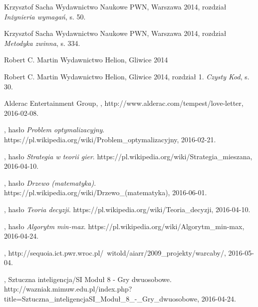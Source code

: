 \documentclass[11pt]{aghdpl}
\begin{document}
\begin{thebibliography}{1}
\bibitem{}
\label{bib:analiza_wymagan}
Krzysztof Sacha
\newblock Wydawnictwo Naukowe PWN, Warszawa 2014,
\newblock rozdział {\em Inżynieria wymagań}, s. 50.

\bibitem{}
\label{bib:metodyka_zwinna}
Krzysztof Sacha
\newblock Wydawnictwo Naukowe PWN, Warszawa 2014,
\newblock rozdział {\em Metodyka zwinna}, s. 334.

\bibitem{}
\label{bib:czysty_kod}
Robert C. Martin
\newblock Wydawnictwo Helion, Gliwice 2014


\bibitem{}
\label{bib:czysty_kod_cytat_booch}
Robert C. Martin
\newblock Wydawnictwo Helion, Gliwice 2014,
\newblock rozdział 1. {\em Czysty Kod}, s. 30.

\bibitem{}
\label{bib:loveLetterWebsite}
Alderac Entertainment Group,
,
\newblock http://www.alderac.com/tempest/love-letter, 2016-02-08.

\bibitem{}
\label{bib:wiki_ProblemOptymalizacyjny}
, hasło {\em Problem optymalizacyjny}.
\newblock https://pl.wikipedia.org/wiki/Problem\_optymalizacyjny, 2016-02-21.

\bibitem{}
\label{bib:wiki_StrategiaTeoriaGier}
, hasło {\em Strategia w teorii gier}.
\newblock https://pl.wikipedia.org/wiki/Strategia\_mieszana, 2016-04-10.

\bibitem{}
\label{bib:wiki_drzewo}
, hasło {\em Drzewo (matematyka)}.
\newblock https://pl.wikipedia.org/wiki/Drzewo\_(matematyka), 2016-06-01.

\bibitem{}
\label{bib:wiki_TeoriaDecyzji}
, hasło {\em Teoria decyzji}.
\newblock https://pl.wikipedia.org/wiki/Teoria\_decyzji, 2016-04-10.

\bibitem{}
\label{bib:wiki_minMax}
, hasło {\em Algorytm min-max}.
\newblock https://pl.wikipedia.org/wiki/Algorytm\_min-max, 2016-04-24.


\bibitem{}
\label{bib:minMax_warcaby}
,
\newblock http://sequoia.ict.pwr.wroc.pl/~witold/aiarr/2009\_projekty/warcaby/, 2016-05-04.

\bibitem{}
\label{bib:wazniak_minMax}
, Sztuczna inteligencja/SI Moduł 8 - Gry dwuosobowe.
\newblock http://wazniak.mimuw.edu.pl/index.php?title=Sztuczna\_inteligencja\/SI\_Moduł\_8\_-\_Gry\_dwuosobowe, 2016-04-24.


\end{thebibliography}
\end{document}
